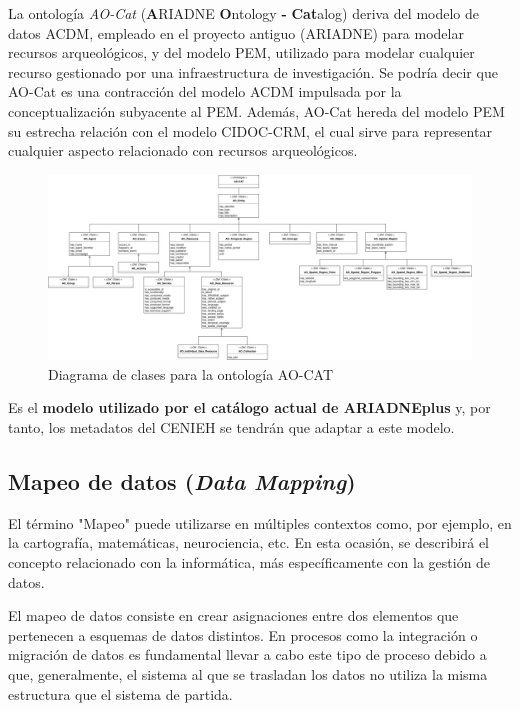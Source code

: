 \documentclass[
]{article}
\begin{document}
La ontología \emph{AO-Cat} (\textbf{A}RIADNE \textbf{O}ntology
\textbf{-} \textbf{Cat}alog) deriva del modelo de datos ACDM, empleado
en el proyecto antiguo (ARIADNE) para modelar recursos arqueológicos, y
del modelo PEM, utilizado para modelar cualquier recurso gestionado por
una infraestructura de investigación. Se podría decir que AO-Cat es una
contracción del modelo ACDM impulsada por la conceptualización
subyacente al PEM. Además, AO-Cat hereda del modelo PEM su estrecha
relación con el modelo CIDOC-CRM, el cual sirve para representar
cualquier aspecto relacionado con recursos arqueológicos.

\begin{figure}
\hypertarget{diagramaDeClasesAOCAT}{%
\centering
\includegraphics{../_static/images/diagramaDeClasesAOCAT.png}
\caption{Diagrama de clases para la ontología
AO-CAT}\label{diagramaDeClasesAOCAT}
}
\end{figure}

Es el \textbf{modelo utilizado por el catálogo actual de ARIADNEplus} y,
por tanto, los metadatos del CENIEH se tendrán que adaptar a este
modelo.

\hypertarget{mapeo-de-datos-data-mapping}{%
\subsection{\texorpdfstring{Mapeo de datos (\emph{Data
Mapping})}{Mapeo de datos (Data Mapping)}}\label{mapeo-de-datos-data-mapping}}

El término "Mapeo" puede utilizarse en múltiples contextos como, por
ejemplo, en la cartografía, matemáticas, neurociencia, etc. En esta
ocasión, se describirá el concepto relacionado con la informática, más
específicamente con la gestión de datos.

El mapeo de datos consiste en crear asignaciones entre dos elementos que
pertenecen a esquemas de datos distintos. En procesos como la
integración o migración de datos es fundamental llevar a cabo este tipo
de proceso debido a que, generalmente, el sistema al que se trasladan
los datos no utiliza la misma estructura que el sistema de partida.
\end{document}
